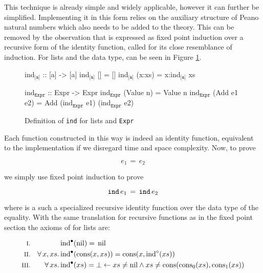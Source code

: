 This technique is already simple and widely applicable, however it can
further be simplified. Implementing it in this form relies on the
auxiliary structure of Peano natural numbers which also needs to be
added to the theory. This can be removed by the observation that is
expressed as fixed point induction over a recursive form of the
identity function, called  for its close resemblance of
induction. For lists and the  data type,  can be seen
in Figure \ref{code:ind}.

\begin{figure}[h!]
\centering
\begin{minipage}[b]{5cm}
\begin{code}[mathescape]
ind$_{\texttt{[a]}}$ :: [a] -> [a]
ind$_{\texttt{[a]}}$ [] = []
ind$_{\texttt{[a]}}$ (x:xs) = x:ind$_{\texttt{[a]}}$ xs
\end{code}
\end{minipage}
\hspace{10pt}
\begin{minipage}[b]{8.3cm}
\begin{code}[mathescape]
ind$_{\texttt{Expr}}$ :: Expr -> Expr
ind$_{\texttt{Expr}}$ (Value n) = Value n
ind$_{\texttt{Expr}}$ (Add e1 e2) = Add (ind$_{\texttt{Expr}}$ e1) (ind$_{\texttt{Expr}}$ e2)
\end{code}
\label{code:approx}
\end{minipage}
\caption{Definition of \texttt{ind} for lists and \texttt{Expr}
\label{code:ind}
}
\end{figure}

Each  function constructed in this way is indeed an identity
function, equivalent to the implementation  if we
disregard time and space complexity. Now, to prove

\begin{equation*}
e_1 \, = \, e_2
\end{equation*}

we simply use fixed point induction to prove

\begin{equation*}
\hs{ind} \, e_1 \, = \, \hs{ind} \, e_2
\end{equation*}

where  is a such a specialized recursive identity function
over the data type of the equality. With the same translation for
recursive functions as in the fixed point section the axioms of
 for lists are:

\begin{align*}
\rom{1} &&             & \tofix{\fn{ind}}(\fn{nil})   \eq \, \fn{nil}                                                           \\
\rom{2} && \faa{x}{xs} & \tofix{\fn{ind}}(\fn{cons}(x,xs)) \eq \fn{cons}(x,\unfix{\fn{ind}}(xs))                                                \\
\rom{3} && \fa{xs}     & \tofix{\fn{ind}}(xs)        \eq \bot \leftarrow xs \neq \fn{nil} \wedge xs \neq \fn{cons}(\fn{cons_0}(xs),\fn{cons_1}(xs)) \\
\end{align*}

